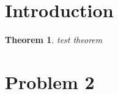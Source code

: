 \documentclass{exam}
\author{Omkar Tasgaonkar}
\newtheorem{thm}{Theorem}[section]
\begin{document}
\thispagestyle{firstpage}

\section*{Introduction}
\begin{thm}
test theorem
\end{thm}
\pagebreak
\section*{Problem 2}
\end{document}
